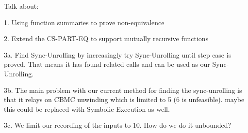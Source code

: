 Talk about:

1. Using function summaries to prove non-equivalence

2. Extend the CS-PART-EQ to support mutually recursive functions

3a. Find Sync-Unrolling by increasingly try Sync-Unrolling until step case is proved. That means it has found related calls and can be used as our Sync-Unrolling. 

3b. The main problem with our current method for finding the sync-unrolling is that it relays on CBMC unwinding which is limited to 5 (6 is unfeasible). 
maybe this could be replaced with Symbolic Execution as well.

3c. We limit our recording of the inputs to 10. How do we do it unbounded?

